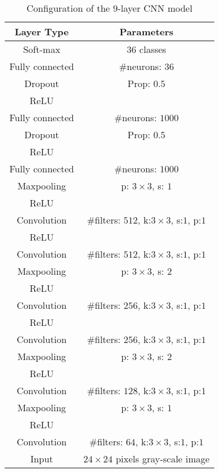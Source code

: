 \documentclass[twocolumn]{svjour3}
\begin{document}
\begin{table}[ht]
	\begin{center}
	\caption{Configuration of the $9$-layer CNN model}
	\label{Tab:2}{
	\begin{tabular}{c|c}
	\hline
	 Layer Type & Parameters  \\
	\hline
	Soft-max & $36$ classes \\
	\hline
	Fully connected & \#neurons: $36$ \\
	\hline
	Dropout & Prop: $0.5$ \\
	\hline
	ReLU & \\
	\hline
	Fully connected & \#neurons: $1000$ \\
	\hline
	Dropout & Prop: $0.5$ \\
	\hline
	ReLU & \\
	\hline
	Fully connected & \#neurons: $1000$ \\
	\hline
	Maxpooling & p: $3 \times 3$, s: $1$ \\
	\hline
    ReLU & \\
 	\hline
 	Convolution & \#filters: $512$, k:$3 \times 3$, s:$1$, p:$1$ \\
	\hline
    ReLU & \\
 	\hline
 	Convolution & \#filters: $512$, k:$3 \times 3$, s:$1$, p:$1$ \\
	\hline
	Maxpooling & p: $3 \times 3$, s: $2$ \\
	\hline
    ReLU & \\
 	\hline
 	Convolution & \#filters: $256$, k:$3 \times 3$, s:$1$, p:$1$ \\
	\hline
    ReLU & \\
 	\hline
 	Convolution & \#filters: $256$, k:$3 \times 3$, s:$1$, p:$1$ \\
 	\hline
 	Maxpooling & p: $3 \times 3$, s: $2$ \\
   \hline
    ReLU & \\
 	\hline
 	Convolution & \#filters: $128$, k:$3 \times 3$, s:$1$, p:$1$ \\
	\hline
	Maxpooling & p: $3 \times 3$, s: $1$ \\
	\hline
	ReLU & \\
	\hline
	Convolution & \#filters: $64$, k:$3 \times 3$, s:$1$, p:$1$ \\
	\hline
	Input & $24 \times 24$ pixels gray-scale image \\
	\hline
	\end{tabular}
	}

	\end{center}
\end{table}
\end{document}
